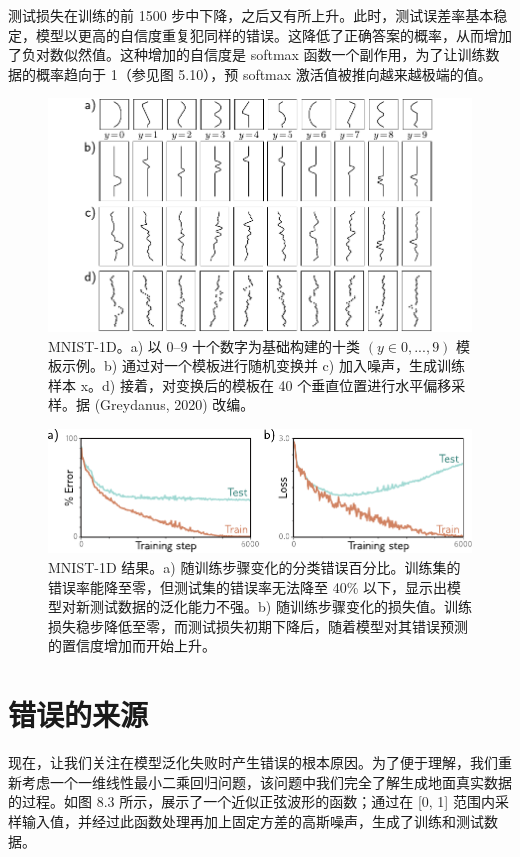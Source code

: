 \documentclass[lang=cn,newtx,10pt,scheme=chinese]{elegantbook}
\begin{document}
测试损失在训练的前 1500 步中下降，之后又有所上升。此时，测试误差率基本稳定，模型以更高的自信度重复犯同样的错误。这降低了正确答案的概率，从而增加了负对数似然值。这种增加的自信度是 softmax 函数一个副作用，为了让训练数据的概率趋向于 1（参见图 5.10），预 softmax 激活值被推向越来越极端的值。

\begin{figure}[ht!]
\centering
\includegraphics[width=0.7\linewidth]{PDFFigures/UDLChap8PDF/PerfMNIST1D.pdf}
\caption{MNIST-1D。a) 以 0–9 十个数字为基础构建的十类 \((y \in {0, . . . , 9})\) 模板示例。b) 通过对一个模板进行随机变换并 c) 加入噪声，生成训练样本 x。d) 接着，对变换后的模板在 40 个垂直位置进行水平偏移采样。据 (Greydanus, 2020) 改编。}
\end{figure}


\begin{figure}[ht!]
\centering
\includegraphics[width=0.7\linewidth]{PDFFigures/UDLChap8PDF/PerfMNIST1DResults.pdf}
\caption{MNIST-1D 结果。a) 随训练步骤变化的分类错误百分比。训练集的错误率能降至零，但测试集的错误率无法降至 40\% 以下，显示出模型对新测试数据的泛化能力不强。b) 随训练步骤变化的损失值。训练损失稳步降低至零，而测试损失初期下降后，随着模型对其错误预测的置信度增加而开始上升。}
\end{figure}

\section{错误的来源}
现在，让我们关注在模型泛化失败时产生错误的根本原因。为了便于理解，我们重新考虑一个一维线性最小二乘回归问题，该问题中我们完全了解生成地面真实数据的过程。如图 8.3 所示，展示了一个近似正弦波形的函数；通过在 [0, 1] 范围内采样输入值，并经过此函数处理再加上固定方差的高斯噪声，生成了训练和测试数据。
\end{document}
